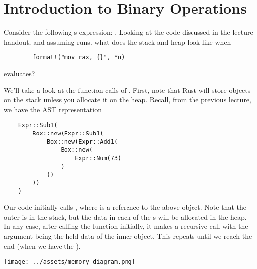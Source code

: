 \documentclass[letterpaper]{article}
\begin{document}
\section{Introduction to Binary Operations}

\begin{mdframed}
    Consider the following s-expression: . Looking at the code discussed in the lecture handout, and assuming  runs, what does the stack and heap look like when \begin{verbatim}
        format!("mov rax, {}", *n)\end{verbatim} 
    evaluates? 

    \begin{mdframed}
        We'll take a look at the function calls of . First, note that Rust will store objects on the stack unless you allocate it on the heap. Recall, from the previous lecture, we have the AST representation 
                \begin{verbatim}
    Expr::Sub1(
        Box::new(Expr::Sub1(
            Box::new(Expr::Add1(
                Box::new(
                    Expr::Num(73)
                )
            ))
        ))
    )\end{verbatim}
        
        Our code initially calls , where  is a reference to the above object. Note that the outer  is in the stack, but the data in each of the s will be allocated in the heap. In any case, after calling the function initially, it makes a recursive call with the argument being the held data of the inner object. This repeats until we reach the end (when we have the ). 
        \begin{center}
            \texttt{[image: ../assets/memory\_diagram.png]}
        \end{center}
    \end{mdframed}
\end{mdframed}
\end{document}
